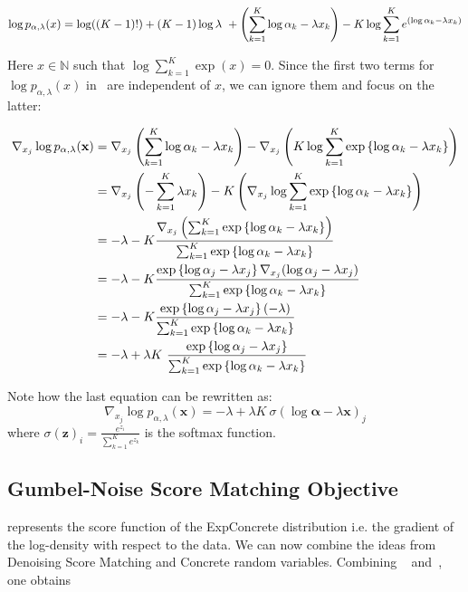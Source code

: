 \begin{equation}
    \label{eq:concrete_log_pdf}
         \log p_{\alpha, \lambda}(x) = \log((K-1)!) + (K-1) \log \lambda~ + \left( { \sum_{k=1}^{K} \log \alpha_k - \lambda x_k } \right) -
         K\log \sum_{k=1}^{K} e^{(\log \alpha_k - \lambda x_k)}
\end{equation}

Here $x \in \mathbb{N} $ such that $ \log \sum_{k=1}^{K} \exp (x) = 0$. Since the first two terms for $\log p_{\alpha, \lambda}(x)$ in~ are independent of $x$, we can ignore them and focus on the latter:

\begin{align}
    \nabla_{x_j} \log p_{\alpha, \lambda}(\mathbf{x}) &= 
    \nabla_{x_j} \left( { \sum_{k=1}^{K} \log \alpha_k - \lambda x_k } \right) -
    \nabla_{x_j} \left( {K\log \sum_{k=1}^{K} \exp \left\{ {\log \alpha_k - \lambda x_k} \right\} } \right) \\
    &= \nabla_{x_j} \left( { - \sum_{k=1}^{K} \lambda x_k } \right) -
   K \left( { \nabla_{x_j} \log \sum_{k=1}^{K} \exp \left\{ {\log \alpha_k - \lambda x_k} \right\}} \right) \\
    &= - \lambda -K\frac{\nabla_{x_j} \left( {\sum_{k=1}^{K} \exp \left\{ {\log \alpha_k - \lambda x_k} \right\}} \right)}{ \sum_{k=1}^{K} \exp \left\{ {\log \alpha_k - \lambda x_k} \right\}} \\
    &= - \lambda -K\frac{\exp \left\{ {\log \alpha_j - \lambda x_j} \right\} \nabla_{x_j} (\log \alpha_j - \lambda x_j)}{ \sum_{k=1}^{K} \exp \left\{ {\log \alpha_k - \lambda x_k} \right\}} \\
    &= - \lambda -K\frac{\exp \left\{ {\log \alpha_j - \lambda x_j} \right\} (- \lambda) }{ \sum_{k=1}^{K} \exp \left\{ {\log \alpha_k - \lambda x_k} \right\}} \\
    &= - \lambda + \lambda K~\frac{\exp \left\{ {\log \alpha_j - \lambda x_j} \right\}}{ \sum_{k=1}^{K} \exp \left\{ {\log \alpha_k - \lambda x_k} \right\}}
\end{align}

Note how the last equation can be rewritten as:
\begin{equation}
\label{eq:concrete_score}
     \nabla_{x_j} \log p_{\alpha, \lambda}(\mathbf{x}) = - \lambda + \lambda K~\sigma(\log \boldsymbol{\alpha} - \lambda \mathbf{x})_j
\end{equation}
where $\sigma(\mathbf{z})_i = \frac{e^{z_i}}{ \sum_{k=1}^{K} e^{z_k}}$ is the softmax function. 

\subsection*{Gumbel-Noise Score Matching Objective}
 represents the score function of the ExpConcrete distribution i.e. the gradient of the log-density with respect to the data. We can now combine the ideas from Denoising Score Matching and Concrete random variables.
Combining ~ and~, one obtains

